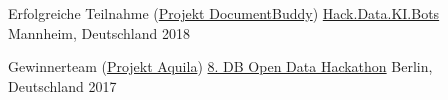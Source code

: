 



\begin{cvhonors}

      \cvhonor
    {Erfolgreiche Teilnahme (\href{https://github.com/DocumentBuddy/DocumentBuddy}{\faGithub\acvHeaderIconSep Projekt DocumentBuddy})} %
    {\href{http://hackathon.nextiteration.de/}{Hack.Data.KI.Bots}} %
    {Mannheim, Deutschland} %
    {2018} %


  \cvhonor
    {Gewinnerteam (\href{https://github.com/dbhack-aquila/aquila}{\faGithub\acvHeaderIconSep Projekt Aquila})} %
    {\href{https://dbmindbox.com/en/db-opendata-hackathons/hackathons/hackathon-8-db-open-data/}{8. DB Open Data Hackathon}} %
    {Berlin, Deutschland} %
    {2017} %
    


\end{cvhonors}
